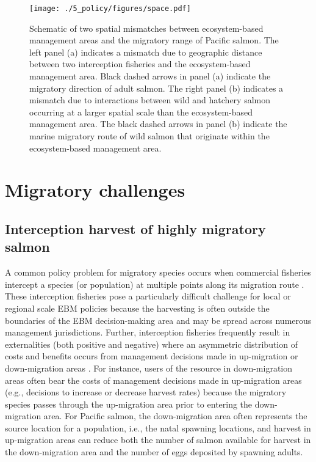 \begin{figure}[htbp]
  \centering \texttt{[image: ./5\_policy/figures/space.pdf]}
  \caption[Schematic of two spatial mismatches between ecosystem-based
           management areas and the migratory range of Pacific
           salmon]{Schematic of two spatial mismatches between ecosystem-based
           management areas and the migratory range of Pacific salmon. The left
           panel (a) indicates a mismatch due to geographic distance between two
           interception fisheries and the ecosystem-based management area. Black
           dashed arrows in panel (a) indicate the migratory direction of adult
           salmon. The right panel (b) indicates a mismatch due to interactions
           between wild and hatchery salmon occurring at a larger spatial scale
           than the ecosystem-based management area. The black dashed arrows in
           panel (b) indicate the marine migratory route of wild salmon that
           originate within the ecosystem-based management area.}
  \label{fig:ebm:1}
\end{figure}



\section{Migratory challenges}

\subsection{Interception harvest of highly migratory salmon}

A common policy problem for migratory species occurs when commercial fisheries
intercept a species (or population) at multiple points along its migration route
\citep{Lascelles2014}. These interception fisheries pose a particularly
difficult challenge for local or regional scale EBM policies because the
harvesting is often outside the boundaries of the EBM decision-making area and
may be spread across numerous management jurisdictions. Further, interception
fisheries frequently result in externalities (both positive and negative) where
an asymmetric distribution of costs and benefits occurs from management
decisions made in up-migration or down-migration areas \citep{Scherer1990}. For
instance, users of the resource in down-migration areas often bear the costs
of management decisions made in up-migration areas (e.g., decisions to
increase or decrease harvest rates) because the migratory species passes through
the up-migration area prior to entering the down-migration area. For Pacific
salmon, the down-migration area often represents the source location for a
population, i.e., the natal spawning locations, and harvest in up-migration
areas can reduce both the number of salmon available for harvest in the
down-migration area and the number of eggs deposited by spawning adults.

